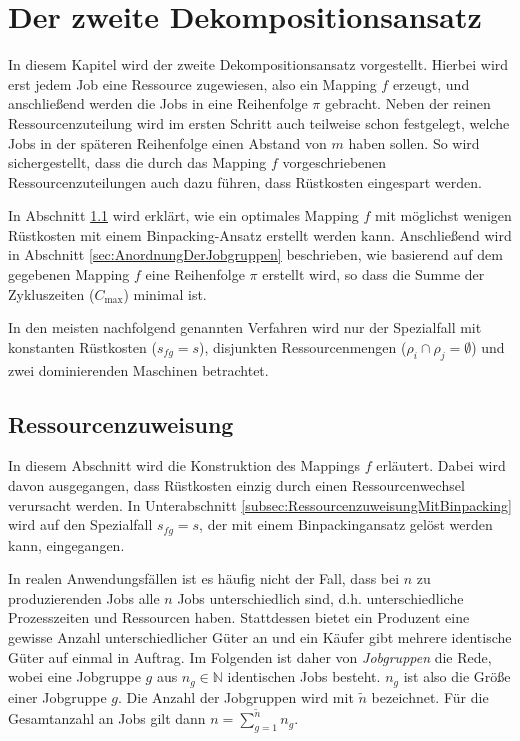 \documentclass{scrreprt}
\begin{document}
\chapter{Der zweite Dekompositionsansatz}
In diesem Kapitel wird der zweite Dekompositionsansatz vorgestellt.
Hierbei wird erst jedem Job eine Ressource zugewiesen, also ein Mapping $f$ erzeugt,
und anschließend werden die Jobs in eine Reihenfolge $\pi$ gebracht.
Neben der reinen Ressourcenzuteilung wird im ersten Schritt auch teilweise schon festgelegt, welche Jobs in der späteren Reihenfolge einen Abstand von $m$ haben sollen.
So wird sichergestellt, dass die durch das Mapping $f$ vorgeschriebenen Ressourcenzuteilungen auch dazu führen, dass Rüstkosten eingespart werden.

In Abschnitt \ref{sec:Ressourcenzuweisung} wird erklärt, wie ein optimales Mapping $f$ mit möglichst wenigen Rüstkosten mit einem Binpacking-Ansatz erstellt werden kann.
Anschließend wird in Abschnitt \ref{sec:AnordnungDerJobgruppen} beschrieben, wie basierend auf dem gegebenen Mapping $f$ eine Reihenfolge $\pi$ erstellt wird,
so dass die Summe der Zykluszeiten ($C_{\max}$) minimal ist.

In den meisten nachfolgend genannten Verfahren wird nur der Spezialfall mit konstanten Rüstkosten ($s_{fg}=s$),
disjunkten Ressourcenmengen ($\rho_i\cap\rho_j=\emptyset$) und zwei dominierenden Maschinen betrachtet.


\section{Ressourcenzuweisung}
\label{sec:Ressourcenzuweisung}
In diesem Abschnitt wird die Konstruktion des Mappings $f$ erläutert.
Dabei wird davon ausgegangen, dass Rüstkosten einzig durch einen Ressourcenwechsel verursacht werden.
In Unterabschnitt \ref{subsec:RessourcenzuweisungMitBinpacking} wird auf den Spezialfall $s_{fg}=s$, der mit einem Binpackingansatz gelöst werden kann,
eingegangen.

In realen Anwendungsfällen ist es häufig nicht der Fall, dass bei $n$ zu produzierenden Jobs alle $n$ Jobs unterschiedlich sind,
d.h. unterschiedliche Prozesszeiten und Ressourcen haben.
Stattdessen bietet ein Produzent eine gewisse Anzahl unterschiedlicher Güter an und ein Käufer gibt mehrere identische Güter auf einmal in Auftrag.
Im Folgenden ist daher von \textit{Jobgruppen} die Rede, wobei eine Jobgruppe $g$ aus $n_g\in\mathbb{N}$ identischen Jobs besteht.
$n_g$ ist also die Größe einer Jobgruppe $g$.
Die Anzahl der Jobgruppen wird mit $\tilde{n}$ bezeichnet.
Für die Gesamtanzahl an Jobs gilt dann $n = \sum_{g=1}^{\tilde{n}} n_g$.
\end{document}
